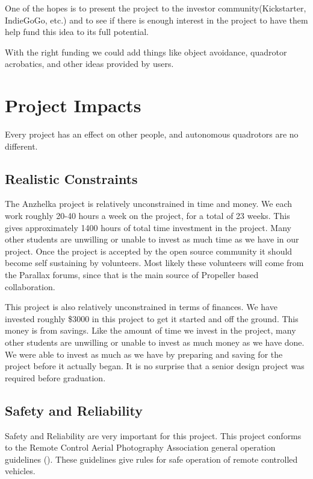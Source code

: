 \documentclass{article}
\numberwithin{equation}{section} %
\begin{document}
One of the hopes is to present the project to the investor community(Kickstarter, IndieGoGo, etc.) and to see if there is enough interest in the project to have them help fund this idea to its full potential.

With the right funding we could add things like object avoidance, quadrotor acrobatics, and other ideas provided by users.

\section{Project Impacts}
Every project has an effect on other people, and autonomous quadrotors are no different.

\subsection{Realistic Constraints}

The Anzhelka project is relatively unconstrained in time and money. We each work roughly 20-40 hours a week on the project, for a total of 23 weeks. This gives approximately 1400 hours of total time investment in the project. Many other students are unwilling or unable to invest as much time as we have in our project. Once the project is accepted by the open source community it should become self sustaining by volunteers. Most likely these volunteers will come from the Parallax forums, since that is the main source of Propeller based collaboration.

This project is also relatively unconstrained in terms of finances. We have invested roughly \$3000 in this project to get it started and off the ground. This money is from savings. Like the amount of time we invest in the project, many other students are unwilling or unable to invest as much money as we have done. We were able to invest as much as we have by preparing and saving for the project before it actually began. It is no surprise that a senior design project was required before graduation.

\subsection{Safety and Reliability}

Safety and Reliability are very important for this project. This project conforms to the Remote Control Aerial Photography Association general operation guidelines (\cite{rcapa_guidelines}). These guidelines give rules for safe operation of remote controlled vehicles. 
\end{document}
